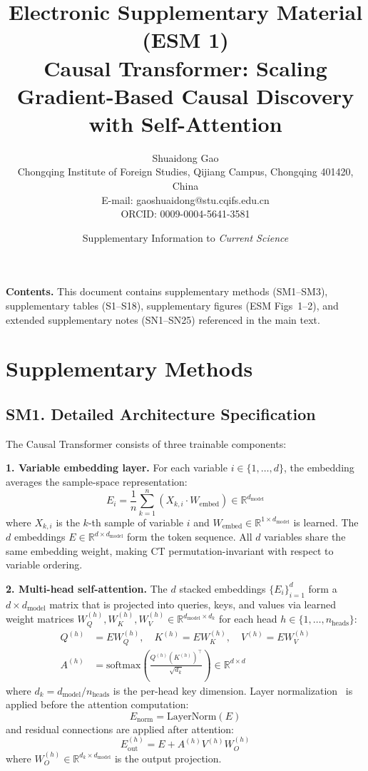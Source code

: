 \documentclass[12pt,a4paper]{article}
\title{\textbf{Electronic Supplementary Material (ESM 1)}\\[0.5em]
\large Causal Transformer: Scaling Gradient-Based Causal Discovery with Self-Attention}
\author{Shuaidong Gao\\[0.3em]
\small Chongqing Institute of Foreign Studies, Qijiang Campus, Chongqing 401420, China\\[0.2em]
\small E-mail: gaoshuaidong@stu.cqifs.edu.cn\\[0.2em]
\small ORCID: 0009-0004-5641-3581}
\date{Supplementary Information to \textit{Current Science}}
\begin{document}
\maketitle
\thispagestyle{empty}
\pagestyle{plain}

\noindent\textbf{Contents.} This document contains supplementary methods (SM1--SM3), supplementary tables (S1--S18), supplementary figures (ESM Figs~1--2), and extended supplementary notes (SN1--SN25) referenced in the main text.

\vspace{1em}

\section*{Supplementary Methods}

\subsection*{SM1. Detailed Architecture Specification}
\label{sec:sm_architecture}

The Causal Transformer consists of three trainable components:

\textbf{1. Variable embedding layer.} For each variable $i \in \{1,\ldots,d\}$, the embedding averages the sample-space representation:
\[
E_i = \frac{1}{n}\sum_{k=1}^{n} (X_{k,i} \cdot W_{\text{embed}}) \in \mathbb{R}^{d_{\text{model}}}
\]
where $X_{k,i}$ is the $k$-th sample of variable $i$ and $W_{\text{embed}} \in \mathbb{R}^{1 \times d_{\text{model}}}$ is learned. The $d$ embeddings $E \in \mathbb{R}^{d \times d_{\text{model}}}$ form the token sequence. All $d$ variables share the same embedding weight, making CT permutation-invariant with respect to variable ordering.

\textbf{2. Multi-head self-attention.} The $d$ stacked embeddings $\{E_i\}_{i=1}^d$ form a $d \times d_{\text{model}}$ matrix that is projected into queries, keys, and values via learned weight matrices $W_Q^{(h)}, W_K^{(h)}, W_V^{(h)} \in \mathbb{R}^{d_{\text{model}} \times d_k}$ for each head $h \in \{1,\ldots,n_{\text{heads}}\}$:
\begin{align*}
Q^{(h)} &= E W_Q^{(h)}, \quad K^{(h)} = E W_K^{(h)}, \quad V^{(h)} = E W_V^{(h)} \\
A^{(h)} &= \text{softmax}\left(\frac{Q^{(h)} (K^{(h)})^\top}{\sqrt{d_k}}\right) \in \mathbb{R}^{d \times d}
\end{align*}
where $d_k = d_{\text{model}} / n_{\text{heads}}$ is the per-head key dimension. Layer normalization~\cite{ba2016layer} is applied before the attention computation:
\[
E_{\text{norm}} = \text{LayerNorm}(E)
\]
and residual connections are applied after attention:
\[
E^{(h)}_{\text{out}} = E + A^{(h)} V^{(h)} W_O^{(h)}
\]
where $W_O^{(h)} \in \mathbb{R}^{d_k \times d_{\text{model}}}$ is the output projection.
\end{document}
